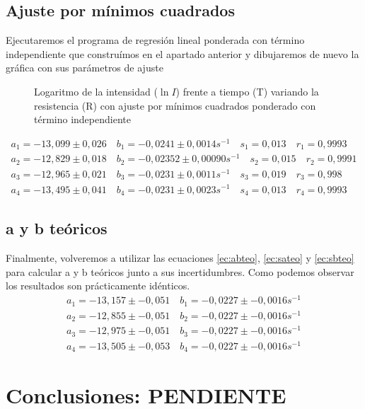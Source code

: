 \documentclass[12pt, a4paper, titlepage]{article}
\begin{document}
  \subsection{Ajuste por mínimos cuadrados}

  Ejecutaremos el programa de regresión lineal ponderada con término independiente que construímos en el apartado anterior y dibujaremos de nuevo la gráfica con sus parámetros de ajuste

  \begin{figure}[H]
    \hspace{0.2em} 
    \caption{Logaritmo de la intensidad ($\ln{I}$) frente a tiempo (T) variando la resistencia (R) con ajuste por mínimos cuadrados ponderado con término independiente}
  \end{figure}
  \begin{gather*}
    a_1 = -13,099 \pm 0,026 \quad b_1 = -0,0241 \pm 0,0014 s^{-1} \quad s_1 = 0,013 \quad r_1 = 0,9993 \\
    a_2 = -12,829 \pm 0,018 \quad b_2 = -0,02352 \pm 0,00090 s^{-1} \quad s_2 = 0,015 \quad r_2 = 0,9991 \\
    a_3 = -12,965 \pm 0,021 \quad b_3 = -0,0231 \pm 0,0011 s^{-1} \quad s_3 = 0,019 \quad r_3 = 0,998 \\
    a_4 = -13,495 \pm 0,041 \quad b_4 = -0,0231 \pm 0,0023 s^{-1} \quad s_4 = 0,013 \quad r_4 = 0,9993
  \end{gather*}

  \subsection{a y b teóricos}

  Finalmente, volveremos a utilizar las ecuaciones \ref{ec:abteo}, \ref{ec:sateo} y \ref{ec:sbteo} para calcular a y b teóricos junto a sus incertidumbres. Como podemos observar los resultados son prácticamente idénticos.
  \begin{gather*}
    a_1 = -13,157 \pm -0,051 \quad b_1 = -0,0227 \pm -0,0016 s^{-1} \\
    a_2 = -12,855 \pm -0,051 \quad b_2 = -0,0227 \pm -0,0016 s^{-1} \\
    a_3 = -12,975 \pm -0,051 \quad b_3 = -0,0227 \pm -0,0016 s^{-1} \\
    a_4 = -13,505 \pm -0,053 \quad b_4 = -0,0227 \pm -0,0016 s^{-1}
  \end{gather*}

  \newpage
  \section{Conclusiones: PENDIENTE}
\end{document}

